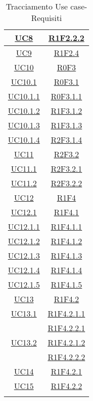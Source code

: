 \begin{longtable}{|c|c|}
	\hline
	\hyperlink{UC8}{UC8} & \hyperlink{R1F2.2.2}{R1F2.2.2}\\
	\hline
	\hyperlink{UC9}{UC9} & \hyperlink{R1F2.4}{R1F2.4}\\
	\hline
	\hyperlink{UC10}{UC10} & \hyperlink{R0F3}{R0F3}\\
	\hline
	\hyperlink{UC10.1}{UC10.1} & \hyperlink{R0F3.1}{R0F3.1}\\
	\hline
	\hyperlink{UC10.1.1}{UC10.1.1} & \hyperlink{R0F3.1.1}{R0F3.1.1}\\
	\hline
	\hyperlink{UC10.1.2}{UC10.1.2} & \hyperlink{R1F3.1.2}{R1F3.1.2}\\
	\hline
	\hyperlink{UC10.1.3}{UC10.1.3} & \hyperlink{R1F3.1.3}{R1F3.1.3}\\
	\hline
	\hyperlink{UC10.1.4}{UC10.1.4} & \hyperlink{R2F3.1.4}{R2F3.1.4}\\
	\hline
	\hyperlink{UC11}{UC11} & \hyperlink{R2F3.2}{R2F3.2}\\
	\hline
	\hyperlink{UC11.1}{UC11.1} & \hyperlink{R2F3.2.1}{R2F3.2.1}\\
	\hline
	\hyperlink{UC11.2}{UC11.2} & \hyperlink{R2F3.2.2}{R2F3.2.2}\\
	\hline
	\hyperlink{UC12}{UC12} & \hyperlink{R1F4}{R1F4}\\
	\hline
	\hyperlink{UC12.1}{UC12.1} & \hyperlink{R1F4.1}{R1F4.1}\\
	\hline
	\hyperlink{UC12.1.1}{UC12.1.1} & \hyperlink{R1F4.1.1}{R1F4.1.1}\\
	\hline
	\hyperlink{UC12.1.2}{UC12.1.2} & \hyperlink{R1F4.1.2}{R1F4.1.2}\\
	\hline
	\hyperlink{UC12.1.3}{UC12.1.3} & \hyperlink{R1F4.1.3}{R1F4.1.3}\\
	\hline
	\hyperlink{UC12.1.4}{UC12.1.4} & \hyperlink{R1F4.1.4}{R1F4.1.4}\\
	\hline
	\hyperlink{UC12.1.5}{UC12.1.5} & \hyperlink{R1F4.1.5}{R1F4.1.5}\\
	\hline
	\hyperlink{UC13}{UC13} & \hyperlink{R1F4.2}{R1F4.2}\\
	\hline
	\hyperlink{UC13.1}{UC13.1} & \hyperlink{R1F4.2.1.1}{R1F4.2.1.1}\\
	& \hyperlink{R1F4.2.2.1}{R1F4.2.2.1}\\
	\hline
	\hyperlink{UC13.2}{UC13.2} & \hyperlink{R1F4.2.1.2}{R1F4.2.1.2}\\
	& \hyperlink{R1F4.2.2.2}{R1F4.2.2.2}\\
	\hline
	\hyperlink{UC14}{UC14} & \hyperlink{R1F4.2.1}{R1F4.2.1}\\
	\hline
	\hyperlink{UC15}{UC15} & \hyperlink{R1F4.2.2}{R1F4.2.2}\\
	\hline
	\caption[Tracciamento Use case-Requisiti]{Tracciamento Use case-Requisiti}
	\label{tabella:requi-usecase}
\end{longtable}
\clearpage
